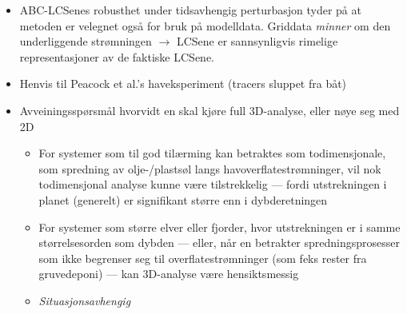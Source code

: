 






\begin{framed}
    \begin{itemize}
    \item ABC-LCSenes robusthet under tidsavhengig perturbasjon tyder på at
        metoden er velegnet også for bruk på modelldata. Griddata \emph{minner}
        om den underliggende strømningen $\to$ LCSene er sannsynligvis rimelige
        representasjoner av de faktiske LCSene.
    \item Henvis til Peacock et al.'s haveksperiment (tracers sluppet fra båt)
    \item Avveiningsspørsmål hvorvidt en skal kjøre full 3D-analyse, eller nøye seg med 2D
        \begin{itemize}
            \item For systemer som til god tilærming kan betraktes som todimensjonale, som
                spredning av olje-/plastsøl langs havoverflatestrømninger, vil nok todimensjonal analyse
                kunne være tilstrekkelig --- fordi utstrekningen i planet (generelt) er signifikant større enn i dybderetningen
                \item For systemer som større elver eller fjorder, hvor utstrekningen er
                    i samme størrelsesorden som dybden --- eller, når en betrakter spredningsprosesser som ikke
                    begrenser seg til overflatestrømninger (som feks rester fra gruvedeponi) ---
                    kan 3D-analyse være hensiktsmessig
                \item \emph{Situasjonsavhengig}
        \end{itemize}
    \end{itemize}
\end{framed}
